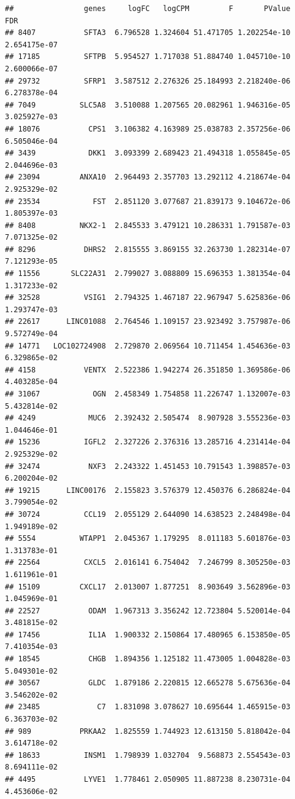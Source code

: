 \documentclass[
]{article}
\begin{document}
\begin{verbatim}
##                genes     logFC   logCPM         F       PValue          FDR
## 8407           SFTA3  6.796528 1.324604 51.471705 1.202254e-10 2.654175e-07
## 17185          SFTPB  5.954527 1.717038 51.884740 1.045710e-10 2.600066e-07
## 29732          SFRP1  3.587512 2.276326 25.184993 2.218240e-06 6.278378e-04
## 7049          SLC5A8  3.510088 1.207565 20.082961 1.946316e-05 3.025927e-03
## 18076           CPS1  3.106382 4.163989 25.038783 2.357256e-06 6.505046e-04
## 3439            DKK1  3.093399 2.689423 21.494318 1.055845e-05 2.044696e-03
## 23094         ANXA10  2.964493 2.357703 13.292112 4.218674e-04 2.925329e-02
## 23534            FST  2.851120 3.077687 21.839173 9.104672e-06 1.805397e-03
## 8408          NKX2-1  2.845533 3.479121 10.286331 1.791587e-03 7.071325e-02
## 8296           DHRS2  2.815555 3.869155 32.263730 1.282314e-07 7.121293e-05
## 11556       SLC22A31  2.799027 3.088809 15.696353 1.381354e-04 1.317233e-02
## 32528          VSIG1  2.794325 1.467187 22.967947 5.625836e-06 1.293747e-03
## 22617      LINC01088  2.764546 1.109157 23.923492 3.757987e-06 9.572749e-04
## 14771   LOC102724908  2.729870 2.069564 10.711454 1.454636e-03 6.329865e-02
## 4158           VENTX  2.522386 1.942274 26.351850 1.369586e-06 4.403285e-04
## 31067            OGN  2.458349 1.754858 11.226747 1.132007e-03 5.432814e-02
## 4249            MUC6  2.392432 2.505474  8.907928 3.555236e-03 1.044646e-01
## 15236          IGFL2  2.327226 2.376316 13.285716 4.231414e-04 2.925329e-02
## 32474           NXF3  2.243322 1.451453 10.791543 1.398857e-03 6.200204e-02
## 19215      LINC00176  2.155823 3.576379 12.450376 6.286824e-04 3.799054e-02
## 30724          CCL19  2.055129 2.644090 14.638523 2.248498e-04 1.949189e-02
## 5554          WTAPP1  2.045367 1.179295  8.011183 5.601876e-03 1.313783e-01
## 22564          CXCL5  2.016141 6.754042  7.246799 8.305250e-03 1.611961e-01
## 15109         CXCL17  2.013007 1.877251  8.903649 3.562896e-03 1.045969e-01
## 22527           ODAM  1.967313 3.356242 12.723804 5.520014e-04 3.481815e-02
## 17456           IL1A  1.900332 2.150864 17.480965 6.153850e-05 7.410354e-03
## 18545           CHGB  1.894356 1.125182 11.473005 1.004828e-03 5.049301e-02
## 30567           GLDC  1.879186 2.220815 12.665278 5.675636e-04 3.546202e-02
## 23485             C7  1.831098 3.078627 10.695644 1.465915e-03 6.363703e-02
## 989           PRKAA2  1.825559 1.744923 12.613150 5.818042e-04 3.614718e-02
## 18633          INSM1  1.798939 1.032704  9.568873 2.554543e-03 8.694111e-02
## 4495           LYVE1  1.778461 2.050905 11.887238 8.230731e-04 4.453606e-02

\end{verbatim}
\end{document}
